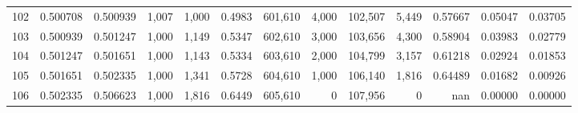 \begin{tabular}{rrrrrrrrrrrrr}
102 &  0.500708 &  0.500939 &   1,007 &  1,000 &                                     0.4983 &  601,610 &    4,000 &  102,507 &    5,449 &  0.57667 &  0.05047 &  0.03705 \\
103 &  0.500939 &  0.501247 &   1,000 &  1,149 &                                     0.5347 &  602,610 &    3,000 &  103,656 &    4,300 &  0.58904 &  0.03983 &  0.02779 \\
104 &  0.501247 &  0.501651 &   1,000 &  1,143 &                                     0.5334 &  603,610 &    2,000 &  104,799 &    3,157 &  0.61218 &  0.02924 &  0.01853 \\
105 &  0.501651 &  0.502335 &   1,000 &  1,341 &                                     0.5728 &  604,610 &    1,000 &  106,140 &    1,816 &  0.64489 &  0.01682 &  0.00926 \\
106 &  0.502335 &  0.506623 &   1,000 &  1,816 &                                     0.6449 &  605,610 &        0 &  107,956 &        0 &      nan &  0.00000 &  0.00000 \\
\bottomrule
\end{tabular}

